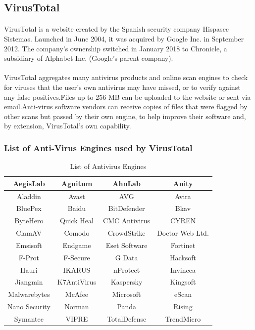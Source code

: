 \documentclass{report}
\begin{document}
\subsection{VirusTotal}
\paragraph{}
VirusTotal is a website created by the Spanish security company Hispasec Sistemas. Launched in June 2004, it was acquired by Google Inc. in September 2012. The company's ownership switched in January 2018 to Chronicle, a subsidiary of Alphabet Inc. (Google's parent company).

\paragraph{}
VirusTotal aggregates many antivirus products and online scan engines to check for viruses that the user's own antivirus may have missed, or to verify against any false positives.Files up to 256 MB can be uploaded to the website or sent via email.Anti-virus software vendors can receive copies of files that were flagged by other scans but passed by their own engine, to help improve their software and, by extension, VirusTotal's own capability. 

\subsubsection{List of Anti-Virus Engines used by VirusTotal}


\begin{table}[h!]
\begin{center}

\begin{tabular}{ |c|c|c|c| } 
 \hline
 AegisLab & Agnitum & AhnLab & Anity\\
 \hline
 Aladdin & Avast & AVG  & Avira \\
 \hline
 BluePex  & Baidu  & BitDefender & Bkav  \\
 \hline
 ByteHero & Quick Heal & CMC Antivirus & CYREN \\
 \hline
 ClamAV  & Comodo & CrowdStrike & Doctor Web Ltd. \\
 \hline
 Emsisoft & Endgame & Eset Software & Fortinet \\
 \hline
 F-Prot  & F-Secure & G Data & Hacksoft \\
 \hline
 Hauri  & IKARUS & nProtect & Invincea  \\
 \hline
 Jiangmin & K7AntiVirus & Kaspersky & Kingsoft\\
 \hline
 Malwarebytes  & McAfee & Microsoft & eScan \\
 \hline
 Nano Security  & Norman & Panda & Rising \\
 \hline
  Symantec  & VIPRE & TotalDefense & TrendMicro \\
 \hline
 
 
 \hline
\end{tabular}
\caption{List of Antivirus Engines}
\end{center}
\end{table}
\end{document}
